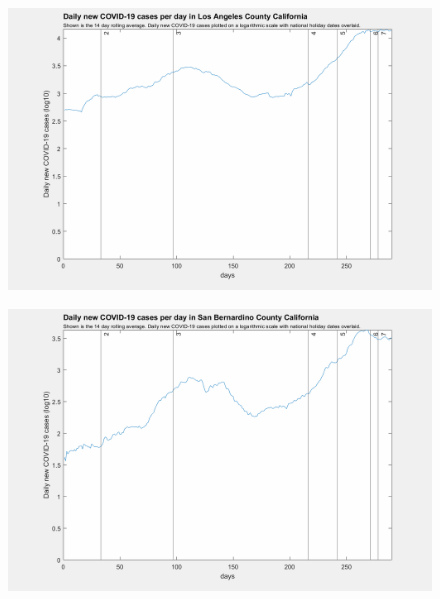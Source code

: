 \documentclass[]{article}
\begin{document}
\begin{figure}[!h]
	\includegraphics[width=\linewidth]{images/los_angeles_cases_holiday_log.png}
	\caption{}
	\label{fig:images/los_angeles_cases_holiday_logLabel}
\end{figure}


\begin{figure}[!h]
	\includegraphics[width=\linewidth]{images/san_bernardino_cases_holiday_log.png}
	\caption{}
	\label{fig:images/san_bernardino_cases_holiday_logLabel}
\end{figure}
\end{document}
